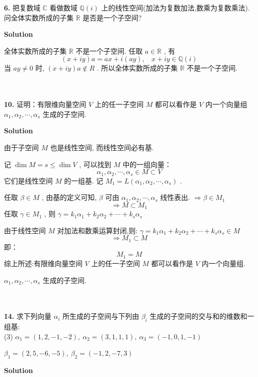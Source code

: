 \documentclass[11pt,a4paper,openany,oneside]{book}
\newcommand\Solution{\noindent\textbf{\textsf{Solution}}\par\medskip}
\begin{document}
\begin{myexample}
	\textbf{6.} 
把复数域 $ \mathbb{C} $ 看做数域 $ \mathbb{Q}(i) $ 上的线性空间(加法为复数加法,数乘为复数乘法). 问全体实数所成的子集 $ \mathbb{R} $ 是否是一个子空间?  \\  

\end{myexample}
\Solution 

全体实数所成的子集 $ \mathbb{R} $ 不是一个子空间. 任取 $ a \in \mathbb{R} $ , 有
 $$  (x+iy)a = ax + i(ay), \ \ \ \ x+iy \in \mathbb{Q}(i)   $$ 
当 $ ay \neq 0 $ 时,  $ (x+iy)a \notin R $ . 所以全体实数所成的子集 $ \mathbb{R} $ 不是一个子空间.  \\  \\  \\ 

\begin{myexample}
	\textbf{10.} 
证明：有限维向量空间 $ V $ 上的任一子空间 $ M $ 都可以看作是 $ V $ 内一个向量组 $ \alpha_1, \alpha_2, \cdots, \alpha_s $ 生成的子空间.
\end{myexample}
\Solution

由于子空间 $ M $ 也是线性空间, 而线性空间必有基.

记 $ \dim   M = s \leq \dim V $ , 可以找到 $ M $ 中的一组向量：
 $$  \alpha_1, \alpha_2, \cdots, \alpha_s  \in M \subset V $$ 
它们是线性空间 $ M $ 的一组基. 记 $ M_1 = L(\alpha_1, \alpha_2, \cdots, \alpha_s) $ .

任取 $ \beta \in M $ , 由基的定义可知,  $ \beta $ 可由 $ \alpha_1, \alpha_2, \cdots, \alpha_s $ 线性表出.  $ \Rightarrow \beta \in M_1  $  
 $$  \Rightarrow M \subset M_1  $$ 
任取 $ \gamma \in M_1 $ , 则 $ \gamma = k_1\alpha_1 + k_2\alpha_2 + \cdots + k_s\alpha_s  $ 

由于线性空间 $ M $ 对加法和数乘运算封闭,则:  $  \gamma = k_1\alpha_1 + k_2\alpha_2 + \cdots + k_s\alpha_s \in M  $ 
 $$  \Rightarrow M_1 \subset M   $$ 
即：
 $$  M_1 = M  $$ 
综上所述:有限维向量空间 $ V $ 上的任一子空间 $ M $ 都可以看作是 $ V $ 内一个向量组.

 $ \alpha_1, \alpha_2, \cdots, \alpha_s $ 生成的子空间. \\  \\   \\

\begin{myexample}
	\textbf{14.} 
求下列向量 $ \alpha_i $ 所生成的子空间与下列由 $ \beta_i $ 生成的子空间的交与和的维数和一组基: \\
(3)  $ \alpha_1 = (1, 2, -1, -2), \ \alpha_2 = (3, 1, 1, 1), \ \alpha_3 = (-1, 0, 1, -1) $  

\hspace{1em}  $ \beta_1 = (2, 5, -6, -5), \ \beta_2 = (-1, 2, -7, 3) $  \\

\end{myexample}
\Solution 
\end{document}
